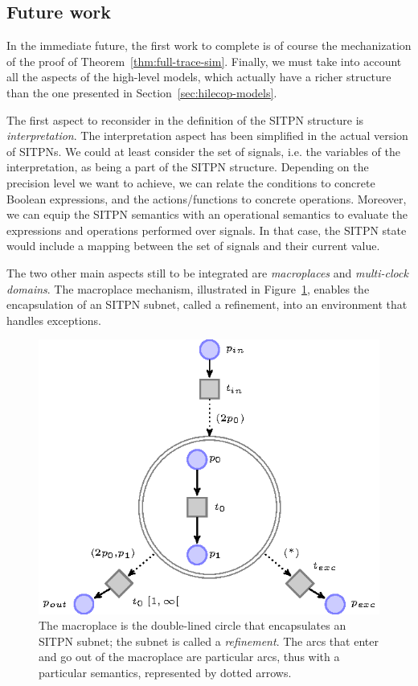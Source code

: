 \documentclass[pdflatex,sn-mathphys]{sn-jnl}%
\theoremstyle{thmstyleone}%
\theoremstyle{thmstyletwo}%
\theoremstyle{thmstylethree}%
\begin{document}

\subsection{Future work}
\label{sec:future}

In the immediate future, the first work to complete is of course the
mechanization of the proof of Theorem~\ref{thm:full-trace-sim}.
Finally, we must take into account all the aspects of the \hilecop{}
high-level models, which actually have a richer structure than the one
presented in Section~\ref{sec:hilecop-models}.

The first aspect to reconsider in the definition of the SITPN
structure is \textit{interpretation}. The interpretation aspect has
been simplified in the actual version of SITPNs. We could at least
consider the set of \vhdl{} signals, i.e. the variables of the
interpretation, as being a part of the SITPN structure. Depending on
the precision level we want to achieve, we can relate the conditions
to concrete Boolean expressions, and the actions/functions to concrete
operations. Moreover, we can equip the SITPN semantics with an
operational semantics to evaluate the expressions and operations
performed over \vhdl{} signals. In that case, the SITPN state would
include a mapping between the set of \vhdl{} signals and their current
value.

The two other main aspects still to be integrated are
\textit{macro\-places} and \textit{multi-clock domains}.  The
macroplace mechanism, illustrated in Figure~\ref{fig:macroplace},
enables the encapsulation of an SITPN subnet, called a refinement,
into an environment that handles exceptions.

\begin{figure}[H]
  \centering
  \includegraphics[keepaspectratio,width=.6\textwidth]{macroplace.eps}
  \caption[An SITPN model with a macroplace.]{The macroplace is the
    double-lined circle that encapsulates an SITPN subnet; the subnet
    is called a \textit{refinement}. The arcs that enter and go out of
    the macroplace are particular arcs, thus with a particular
    semantics, represented by dotted arrows.}
  \label{fig:macroplace}
\end{figure}
\end{document}
